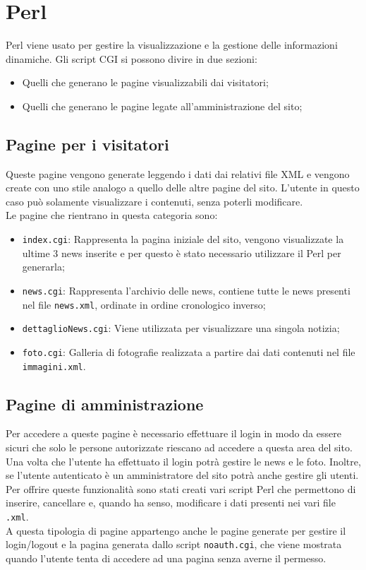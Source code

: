 \section{Perl}

Perl viene usato per gestire la visualizzazione e la gestione delle informazioni dinamiche.
Gli script CGI si possono divire in due sezioni:
\begin{itemize}
\item Quelli che generano le pagine visualizzabili dai visitatori;
\item Quelli che generano le pagine legate all'amministrazione del sito;
\end{itemize}


\subsection{Pagine per i visitatori}

Queste pagine vengono generate leggendo i dati dai relativi file XML e vengono create con uno stile analogo a quello delle altre pagine del sito.
L'utente in questo caso può solamente visualizzare i contenuti, senza poterli modificare.\\
Le pagine che rientrano in questa categoria sono:
\begin{itemize}
\item \texttt{index.cgi}: Rappresenta la pagina iniziale del sito, vengono visualizzate la ultime 3 news inserite e per questo è stato necessario utilizzare il Perl per generarla;
\item \texttt{news.cgi}: Rappresenta l'archivio delle news, contiene tutte le news presenti nel file \texttt{news.xml}, ordinate in ordine cronologico inverso;
\item \texttt{dettaglioNews.cgi}: Viene utilizzata per visualizzare una singola notizia;
\item \texttt{foto.cgi}: Galleria di fotografie realizzata a partire dai dati contenuti nel file \texttt{immagini.xml}.
\end{itemize}


\subsection{Pagine di amministrazione}

Per accedere a queste pagine è necessario effettuare il login in modo da essere sicuri che solo le persone autorizzate riescano ad accedere a questa area del sito.
Una volta che l'utente ha effettuato il login potrà gestire le news e le foto.
Inoltre, se l'utente autenticato è un amministratore del sito potrà anche gestire gli utenti.\\
Per offrire queste funzionalità sono stati creati vari script Perl che permettono di inserire, cancellare e, quando ha senso, modificare i dati presenti nei vari file \texttt{.xml}.\\
A questa tipologia di pagine appartengo anche le pagine generate per gestire il login/logout e la pagina generata dallo script \texttt{noauth.cgi}, che viene mostrata quando l'utente tenta di accedere ad una pagina senza averne il permesso.

